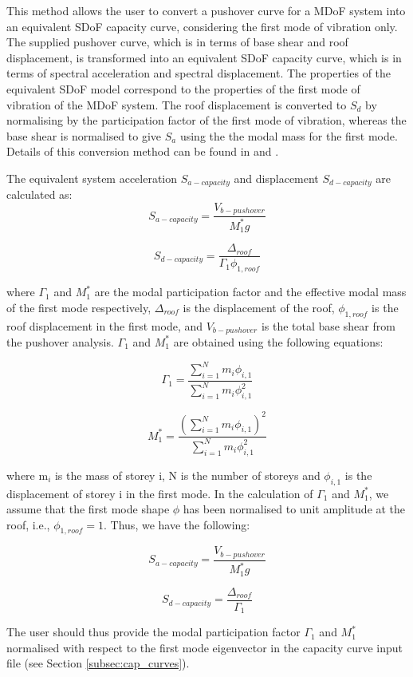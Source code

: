 This method allows the user to convert a pushover curve for a MDoF system into an equivalent SDoF capacity curve, considering the first mode of vibration only. The supplied pushover curve, which is in terms of base shear and roof displacement, is transformed into an equivalent SDoF capacity curve, which is in terms of spectral acceleration and spectral displacement. The properties of the equivalent SDoF model correspond to the properties of the first mode of vibration of the MDoF system. The roof displacement is converted to $S_d$ by normalising by the participation factor of the first mode of vibration, whereas the base shear is normalised to give $S_a$ using the the modal mass for the first mode. Details of this conversion method can be found in \citet{ATC1996} and \citet{FEMA4402005}.

The equivalent system acceleration $S_{a-capacity}$ and displacement $S_{d-capacity}$ are calculated as:
\begin{equation}
	S_{a-capacity} = \frac{V_{b-pushover}}{M_{1}^{*} g}
\end{equation}

\begin{equation}
	S_{d-capacity} = \frac{\Delta_{roof}}{\Gamma_{1} \phi_{1, roof}}
\end{equation}

where $\Gamma_{1}$ and $M_{1}^{*}$ are the modal participation factor and the effective modal mass of the first mode respectively, $\Delta_{roof}$ is the displacement of the roof, $\phi_{1, roof}$ is the roof displacement in the first mode, and $V_{b-pushover}$ is the total base shear from the pushover analysis. $\Gamma_{1}$ and $M_{1}^{*}$ are obtained using the following equations:

\begin{equation}
	\Gamma_{1} = \frac{\sum_{i=1}^{N} m_i \phi_{i,1}}{\sum_{i=1}^{N} m_i \phi_{i,1}^2}
\end{equation}

\begin{equation}
	M_{1}^{*} = \frac{(\sum_{i=1}^{N} m_i \phi_{i,1})^2}{\sum_{i=1}^{N} m_i \phi_{i,1}^2}
\end{equation}

where m$_i$ is the mass of storey i, N is the number of storeys and $\phi_{i,1}$ is the displacement of storey i in the first mode. In the calculation of $\Gamma_1$ and $M_{1}^{*} $, we assume that the first mode shape $\phi$ has been normalised to unit amplitude at the roof, i.e., $\phi_{1, roof} = 1$. Thus, we have the following:

\begin{equation}
	S_{a-capacity} = \frac{V_{b-pushover}}{M_{1}^{*} g}
\end{equation}

\begin{equation}
	S_{d-capacity} = \frac{\Delta_{roof}}{\Gamma_1}
\end{equation}

The user should thus provide the modal participation factor $\Gamma_1$ and $M_{1}^{*} $ normalised with respect to the first mode eigenvector in the capacity curve input file (see Section \ref{subsec:cap_curves}).